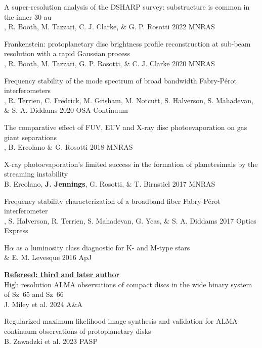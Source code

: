 \documentclass[10pt,preprint]{aastex}
\begin{document}
\noindent A super-resolution analysis of the DSHARP survey: substructure is common in the inner 30 au \\
, R. Booth, M. Tazzari, C. J. Clarke, \& G. P. Rosotti 2022 MNRAS

\noindent Frankenstein: protoplanetary disc brightness profile reconstruction at sub-beam resolution with a rapid Gaussian process \\
, R. Booth, M. Tazzari, G. P. Rosotti, \& C. J. Clarke 2020 MNRAS

\noindent Frequency stability of the mode spectrum of broad bandwidth Fabry-P{\'e}rot interferometers \\
, R. Terrien, C. Fredrick, M. Grisham, M. Notcutt, S. Halverson, S. Mahadevan, \\ 
\indent \& S. A. Diddams 2020 OSA Continuum 

\noindent The comparative effect of FUV, EUV and X-ray disc photoevaporation on gas giant separations \\
, B. Ercolano \& G. Rosotti 2018 MNRAS 

\noindent X-ray photoevaporation's limited success in the formation of planetesimals by the streaming instability\\
\indent B. Ercolano, {\bf J. Jennings}, G. Rosotti, \& T. Birnstiel 2017 MNRAS


\noindent Frequency stability characterization of a broadband fiber Fabry-P{\'e}rot interferometer \\
, S. Halverson, R. Terrien, S. Mahadevan, G. Ycas, \& S. A. Diddams 2017 Optics Express

\noindent H$\alpha$ as a luminosity class diagnostic for K- and M-type stars \\
 \& E. M. Levesque 2016 ApJ 

\noindent \underline{{\bf Refereed: third and later author}} \\
\noindent High resolution ALMA observations of compact discs in the wide binary system of Sz~65 and Sz~66\\
\indent J. Miley et al. 2024 A\&A

\noindent Regularized maximum likelihood image synthesis and validation for ALMA continuum
observations of protoplanetary disks \\
\indent B. Zawadzki et al. 2023 PASP
\end{document}
